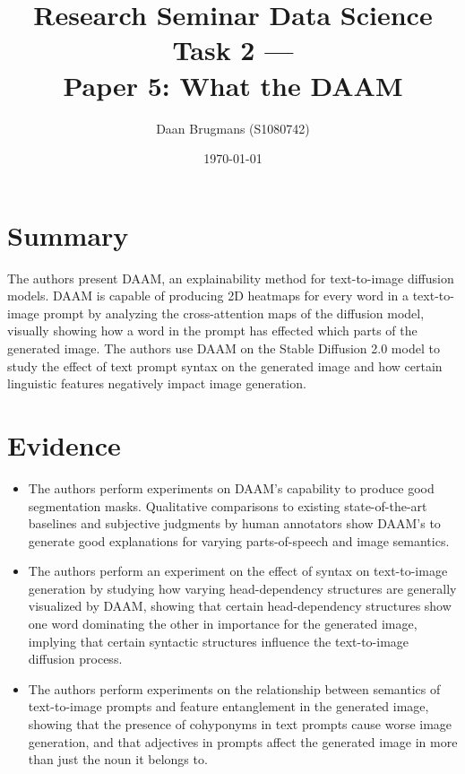 \documentclass{IEEEtran}
\begin{document}
\title{Research Seminar Data Science Task 2 ---\\Paper 5: What the DAAM}
\author{Daan Brugmans (S1080742)}
\date{\today}

\maketitle

\section{Summary}
The authors present DAAM, an explainability method for text-to-image diffusion models.
DAAM is capable of producing 2D heatmaps for every word in a text-to-image prompt by analyzing the cross-attention maps of the diffusion model, visually showing how a word in the prompt has effected which parts of the generated image.
The authors use DAAM on the Stable Diffusion 2.0 model to study the effect of text prompt syntax on the generated image and how certain linguistic features negatively impact image generation.

\section{Evidence}
\begin{itemize}
    \item The authors perform experiments on DAAM's capability to produce good segmentation masks. Qualitative comparisons to existing state-of-the-art baselines and subjective judgments by human annotators show DAAM's to generate good explanations for varying parts-of-speech and image semantics.
    \item The authors perform an experiment on the effect of syntax on text-to-image generation by studying how varying head-dependency structures are generally visualized by DAAM, showing that certain head-dependency structures show one word dominating the other in importance for the generated image, implying that certain syntactic structures influence the text-to-image diffusion process.
    \item The authors perform experiments on the relationship between semantics of text-to-image prompts and feature entanglement in the generated image, showing that the presence of cohyponyms in text prompts cause worse image generation, and that adjectives in prompts affect the generated image in more than just the noun it belongs to.
\end{itemize}
\end{document}
